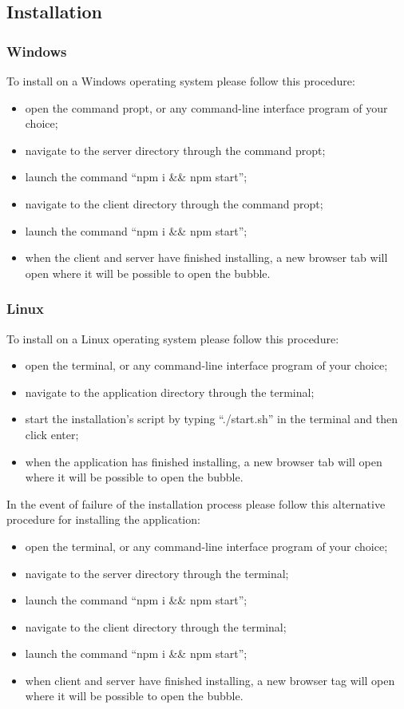 \subsection{Installation}
\subsubsection{Windows}

To install \DemoName{} on a Windows operating system please follow this procedure:
\begin{itemize}
	\item open the command propt, or any command-line interface program of your choice;
	\item navigate to the server directory through the command propt;
	\item launch the command ``npm i \&\& npm start'';
	\item navigate to the client directory through the command propt;
	\item launch the command ``npm i \&\& npm start'';
	\item when the client and server have finished installing, a new browser tab will open where it will be possible to open the bubble.
\end{itemize}

\subsubsection{Linux}
To install \DemoName{} on a Linux operating system please follow this procedure:
\begin{itemize}
	\item open the terminal, or any command-line interface program of your choice;
	\item navigate to the application directory through the terminal; 
	\item start the installation's script by typing ``./start.sh'' in the terminal and then click enter;
	\item when the application has finished installing, a new browser tab will open where it will be possible to open the bubble.
\end{itemize}

In the event of failure of the installation process please follow this alternative procedure for installing the application:
\begin{itemize}
	\item open the terminal, or any command-line interface program of your choice;
	\item navigate to the server directory through the terminal;
	\item launch the command ``npm i \&\& npm start'';
	\item navigate to the client directory through the terminal;
	\item launch the command ``npm i \&\& npm start'';
	\item when client and server have finished installing, a new browser tag will open where it will be possible to open the bubble.
\end{itemize}
